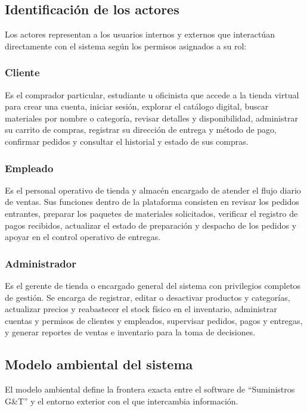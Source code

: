 \subsection{Identificación de los actores}
Los actores representan a los usuarios internos y externos que interactúan directamente con el sistema según los permisos asignados a su rol:

\subsubsection{Cliente}
Es el comprador particular, estudiante u oficinista que accede a la tienda virtual para crear una cuenta, iniciar sesión, explorar el catálogo digital, buscar materiales por nombre o categoría, revisar detalles y disponibilidad, administrar su carrito de compras, registrar su dirección de entrega y método de pago, confirmar pedidos y consultar el historial y estado de sus compras.

\subsubsection{Empleado}
Es el personal operativo de tienda y almacén encargado de atender el flujo diario de ventas. Sus funciones dentro de la plataforma consisten en revisar los pedidos entrantes, preparar los paquetes de materiales solicitados, verificar el registro de pagos recibidos, actualizar el estado de preparación y despacho de los pedidos y apoyar en el control operativo de entregas.

\subsubsection{Administrador}
Es el gerente de tienda o encargado general del sistema con privilegios completos de gestión. Se encarga de registrar, editar o desactivar productos y categorías, actualizar precios y reabastecer el stock físico en el inventario, administrar cuentas y permisos de clientes y empleados, supervisar pedidos, pagos y entregas, y generar reportes de ventas e inventario para la toma de decisiones.

\subsection{Modelo ambiental del sistema}
El modelo ambiental define la frontera exacta entre el software de ``Suministros G\&T'' y el entorno exterior con el que intercambia información.

